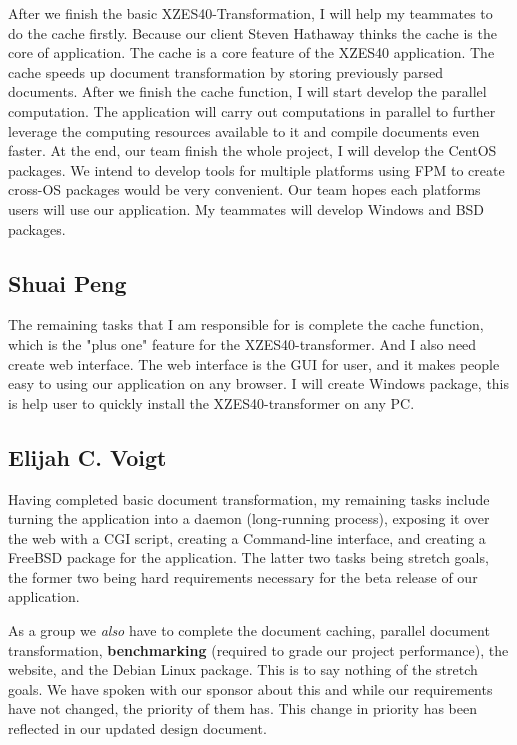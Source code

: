 After we finish the basic XZES40-Transformation, I will help my teammates to do the cache firstly. 
Because our client Steven Hathaway thinks the cache is the core of application. 
The cache is a core feature of the XZES40 application.
The cache speeds up document transformation by storing previously parsed documents. 
After we finish the cache function, I will start develop the parallel computation. 
The application will carry out computations in parallel to further leverage the computing resources available to it and compile documents even faster. 
At the end, our team finish the whole project, I will develop the CentOS packages.
We intend to develop tools for multiple platforms using FPM to create cross-OS packages would be very convenient.  
Our team hopes each platforms users will use our application.
My teammates will develop Windows and BSD packages.

\subsection{Shuai Peng}

The remaining tasks that I am responsible for is complete the cache function, which is the "plus one" feature for the XZES40-transformer. 
And I also need create web interface. 
The web interface is the GUI for user, and it makes people easy to using our application on any browser.
I will create Windows package, this is help user to quickly install the XZES40-transformer on any PC.


\subsection{Elijah C. Voigt}

Having completed basic document transformation, my remaining tasks include turning the application into a daemon (long-running process), exposing it over the web with a CGI script, creating a Command-line interface, and creating a FreeBSD package for the application.
The latter two tasks being stretch goals, the former two being hard requirements necessary for the beta release of our application.

As a group we \textit{also} have to complete the document caching, parallel document transformation, \textbf{benchmarking} (required to grade our project performance), the website, and the Debian Linux package.
This is to say nothing of the stretch goals.
We have spoken with our sponsor about this and while our requirements have not changed, the priority of them has.
This change in priority has been reflected in our updated design document.


